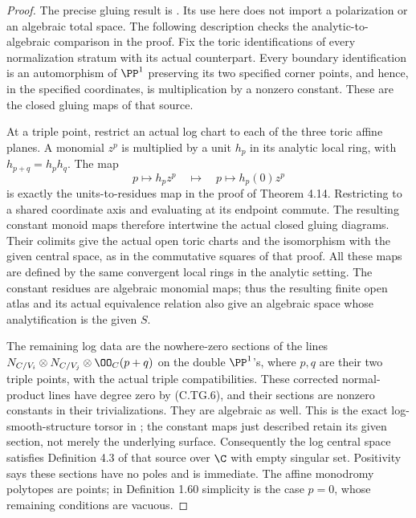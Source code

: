 \begin{proof}
The precise gluing result is
\cite[Theorems 4.14, 5.2 and 5.4]{GrossSiebert2006I}.
Its use here does not import a polarization or an
algebraic total space. The following description
checks the analytic-to-algebraic comparison in the
proof. Fix the toric identifications of every
normalization stratum with its actual counterpart.
Every boundary identification is an automorphism
of $\PP^1$ preserving its two specified corner
points, and hence, in the specified coordinates,
is multiplication by a nonzero constant. These
are the closed gluing maps of that source.

At a triple point, restrict an actual log chart
to each of the three toric affine planes. A
monomial $z^p$ is multiplied by a unit $h_p$
in its analytic local ring, with
$h_{p+q}=h_ph_q$. The map
\[
       p\longmapsto h_pz^p
       \quad\longmapsto\quad
       p\longmapsto h_p(0)z^p
\tag{C.TG.9}
\]
is exactly the units-to-residues map in the proof
of Theorem 4.14. Restricting to a shared coordinate
axis and evaluating at its endpoint commute.
The resulting constant monoid maps therefore
intertwine the actual closed gluing diagrams.
Their colimits give the actual open toric charts
and the isomorphism with the given central space,
as in the commutative squares of that proof.
All these maps are defined by the same convergent
local rings in the analytic setting. The constant
residues are algebraic monomial maps; thus the
resulting finite open atlas and its actual
equivalence relation also give an algebraic
space whose analytification is the given $S$.

The remaining log data are the nowhere-zero
sections of the lines
$N_{C/V_i}\otimes N_{C/V_j}\otimes\OO_C(p+q)$
on the double $\PP^1$'s, where $p,q$ are their
two triple points, with the actual triple
compatibilities. These corrected normal-product
lines have degree zero by (C.TG.6), and
their sections are nonzero constants in their
trivializations. They are algebraic as well.
This is the exact log-smooth-structure torsor
in \cite[Example 3.30 and Theorem 3.22]{GrossSiebert2006I};
the constant maps just described retain its
given section, not merely the underlying surface.
Consequently the log central space satisfies
Definition 4.3 of that source over $\C$ with
empty singular set. Positivity says these
sections have no poles and is immediate.
The affine monodromy polytopes are points;
in Definition 1.60 simplicity is the case
$p=0$, whose remaining conditions are vacuous.


\end{proof}
